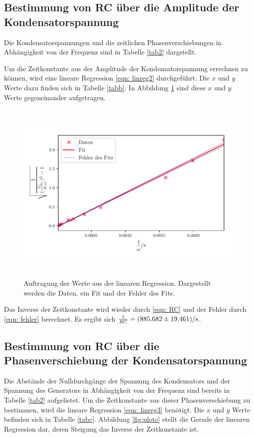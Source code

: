 \subsection{Bestimmung von RC über die Amplitude der Kondensatorspannung}
\label{sec: b}
Die Kondensatorspannungen und die zeitlichen Phasenverschiebungen in Abhängigkeit
von der Frequenz sind in Tabelle \ref{tab2} dargstellt.

Um die Zeitkonstante aus der Amplitude der Kondensatorspannung errechnen zu können, wird eine lineare Regression 
\eqref{eqn: linreg2} durchgeführt. Die $x$ und $y$ Werte dazu finden sich in Tabelle \ref{tabb}.
In Abbildung \ref{fig:plotb} sind diese $x$ und $y$ Werte gegeneinander aufgetragen.


\begin{figure}
  \centering
  \includegraphics[width=13cm, height=9cm]{build/plotb.pdf}
  \caption{Auftragung der Werte aus der linearen Regression. Dargestellt werden die Daten, ein Fit und der Fehler des Fits.}
  \label{fig:plotb}
\end{figure}

\noindent Das Inverse der Zeitkonstante wird wieder durch \eqref{eqn: RC} und der Fehler durch \eqref{eqn: fehler}
berechnet. Es ergibt sich $\frac{1}{RC} = \SI{885.682  \pm 19.461}{\per\second}$.

\subsection{Bestimmung von RC über die Phasenverschiebung der Kondensatorspannung}
\label{sec: c}
Die Abstände der Nulldurchgänge der Spannung des Kondensators und der Spannung des Generators in Abhängigkeit
von der Frequenz sind bereits in Tabelle \ref{tab2} aufgelistet.
Um die Zeitkonstante aus dieser Phasenverschiebung zu bestimmen, wird die lineare Regression \eqref{eqn: linreg3} benötigt.
Die $x$ und $y$ Werte befinden sich in Tabelle \ref{tabc}. Abbildung \ref{fig:plotc} stellt die Gerade der
linearen Regression dar, deren Steigung das Inverse der Zeitkonstante ist.


